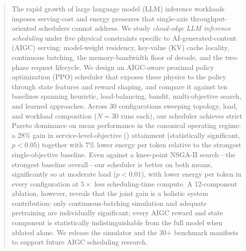 
\begin{abstract}
The rapid growth of large language model (LLM) inference workloads
imposes serving-cost and energy pressures that single-axis
throughput-oriented schedulers cannot address. We study
\emph{cloud-edge LLM inference scheduling} under five
physical constraints specific to AI-generated-content (AIGC)
serving: model-weight residency,
key-value (KV) cache locality, continuous batching, the
memory-bandwidth floor of decode, and the two-phase
request lifecycle. We design an AIGC-aware
proximal policy optimization (PPO) scheduler that exposes these
physics to the policy through state features and reward
shaping, and compare it against ten baselines spanning
heuristic, load-balancing, bandit, multi-objective search,
and learned approaches.
Across 30 configurations sweeping topology, load, and workload
composition ($N{=}30$ runs each), our scheduler achieves
strict Pareto dominance on mean performance in the canonical
operating regime: a
28\% gain in service-level-objective (\slo) attainment
(statistically significant,
$p<0.05$) together with 7\% lower energy per token relative to
the strongest single-objective baseline. Even against a
knee-point NSGA-II search---the strongest baseline
overall---our scheduler is better on both means,
significantly so at moderate load ($p<0.01$), with lower
energy per token in every configuration at $5\times$ less
scheduling-time compute. A 12-component ablation,
however, reveals that the joint gain is a holistic system
contribution: only continuous-batching simulation and adequate
pretraining are individually significant; every AIGC reward and
state component is statistically indistinguishable from the full
model when ablated alone. We release the simulator and the 30+
benchmark manifests to support future AIGC scheduling research.
\end{abstract}
